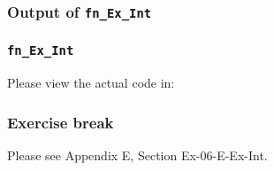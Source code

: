 \begin{frame}[fragile]
\frametitle{Output of {\tt fn\_Ex\_Int}}

\footnotesize


\end{frame}


\begin{frame}
\frametitle{{\tt fn\_Ex\_Int}}

\footnotesize

\begin{center}\large
 Please view the actual code in: 
\end{center}

\end{frame}


\begin{frame}
\frametitle{\EmojiExercise \hmm Exercise break}

Please see Appendix E, Section Ex-06-E-Ex-Int.

\end{frame}






